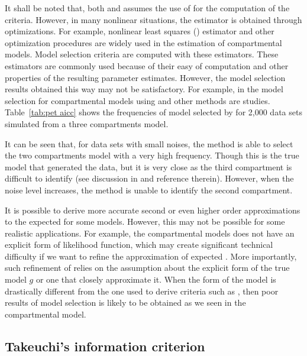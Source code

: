 It shall be noted that, both \aic and \aicc assumes the use of \mle for the
computation of the criteria. However, in many nonlinear situations, the
estimator is obtained through optimizations. For example, nonlinear least
squares (\nls) estimator and other optimization procedures are widely used in
the estimation of \pet compartmental models. Model selection criteria are
computed with these estimators. These estimators are commonly used because of
their easy of computation and other properties of the resulting parameter
estimates. However, the model selection results obtained this way may not be
satisfactory. For example, in \cite{Zhou2013} the model selection for \pet
compartmental models using \aic and other methods are studies.
Table~\ref{tab:pet aicc} shows the frequencies of model selected by \aicc for
2,000 data sets simulated from a three compartments model.



It can be seen that, for data sets with small noises, the \aicc method is able
to select the two compartments model with a very high frequency. Though this
is the true model that generated the data, but it is very close as the third
compartment is difficult to identify (see discussion in \cite{Zhou2013} and
reference therein). However, when the noise level increases, the method is
unable to identify the second compartment.

It is possible to derive more accurate second or even higher order
approximations to the expected \kld for some models. However, this may not be
possible for some realistic applications. For example, the \pet compartmental
models does not have an explicit form of likelihood function, which may create
significant technical difficulty if we want to refine the \aic approximation
of expected \kld. More importantly, such refinement of \aic relies on the
assumption about the explicit form of the true model $g$ or one that closely
approximate it. When the form of the model is drastically different from the
one used to derive criteria such as \aicc, then poor results of model
selection is likely to be obtained as we seen in the \pet compartmental model.

\subsection{Takeuchi's information criterion}
\label{sub:Takeuchi's information criterion}

